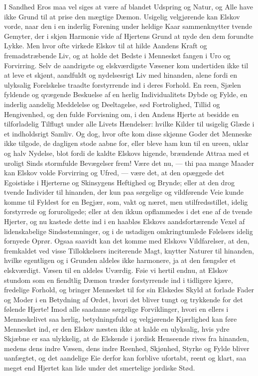 \documentclass[12pt,a4paper]{book}
\newcommand{\apage}[1]{\marginnote{\footnotesize\textit{[#1]}}}
\begin{document}
I Sandhed Eros maa vel siges at være af blandet Udspring og Natur, og
Alle have ikke Grund til at prise den mægtige Dæmon. Usigelig
velgjørende kan Elskov vorde, naar den i en inderlig Forening under
heldige Kaar sammenknytter tvende Gemyter, der i skjøn Harmonie vide af
Hjertens Grund at nyde den dem forundte Lykke. Men hvor ofte virkede
Elskov til at hilde Aandens Kraft og fremadstræbende Liv, og at holde
det Bedste i Mennesket fangen i Uro og Forvirring. Selv de aandrigste og
elskværdigste Væsener kom undertiden ikke til at leve et skjønt,
aandfuldt og nydelsesrigt Liv med hinanden, alene fordi en ulyksalig
Forelskelse traadte forstyrrende ind i deres Forhold. En reen, Sjælen
fyldende og qvægende Beskuelse af en herlig Individualitets Dybde og
Fylde, en inderlig aandelig Meddelelse og Deeltagelse, sød Fortrolighed,
Tillid og Hengivenhed, og den fulde Forvisning om, i den Andens Hjerte
at besidde en tilforladelig Tilflugt \apage{131} under alle Livets Hændelser: hvilke
Kilder til usigelig Glæde i et indholdsrigt Samliv. Og dog, hvor ofte
kom disse skjønne Goder det Menneske ikke tilgode, de dagligen stode
aabne for, eller bleve ham kun til en ureen, uklar og halv Nydelse, blot
fordi de kaldte Elskovs higende, brændende Attraa med et uroligt Sinds
stormfulde Bevægelser frem! Være det nu, --- thi paa mange Maader kan
Elskov volde Forvirring og Ufred, --- være det, at den opæggede det
Egoistiske i Hjerterne og Skinsygens Heftighed og Brynde; eller at den
drog tvende Individer til hinanden, der kun paa sørgelige og vildførende
Veie kunde komme til Fyldest for en Begjær, som, vakt og næret, men
utilfredsstillet, idelig forstyrrede og foruroligede; eller at den ikkun
opflammedes i det ene af de tvende Hjerter, og nu kastede dette ind i en
haabløs Elskovs aandsfortærende Vexel af lidenskabelige Sindsstemninger,
og i de ustadigen omkringtumlede Følelsers idelig fornyede Oprør. Ogsaa
saavidt kan det komme med Elskovs Vildfarelser, at den, fremkaldet ved
visse Tillokkelsers inciterende Magt, knytter Naturer til hinanden,
hvilke egentligen og i Grunden aldeles ikke harmonere, ja at den
fængsler et elskværdigt. Væsen til en aldeles Uværdig. Føie vi hertil
endnu, at Elskov stundom som en fiendtlig Dæmon træder forstyrrende ind
i tidligere kjære, fredelige Forhold, og bringer Mennesket til for sin
Elskedes Skyld at forlade Fader og Moder i en Betydning af Ordet, hvori
det bliver tungt og trykkende for det følende \apage{132} Hjerte! Imod alle
saadanne sørgelige Forviklinger, hvori en ellers i Menneskelivet saa
herlig, betydningsfuld og velgjørende Kjærlighed kan føre Mennesket ind,
er den Elskov næsten ikke at kalde en ulyksalig, hvis ydre Skjæbne er
saa ulykkelig, at de Elskende i jordisk Henseende rives fra hinanden,
medens dens indre Væsen, dens indre Reenhed, Skjønhed, Styrke og Fylde
bliver uanfægtet, og det aandelige Eie derfor kan forblive ufortabt,
reent og klart, saa meget end Hjertet kan lide under det smertelige
jordiske Stød.
\end{document}
